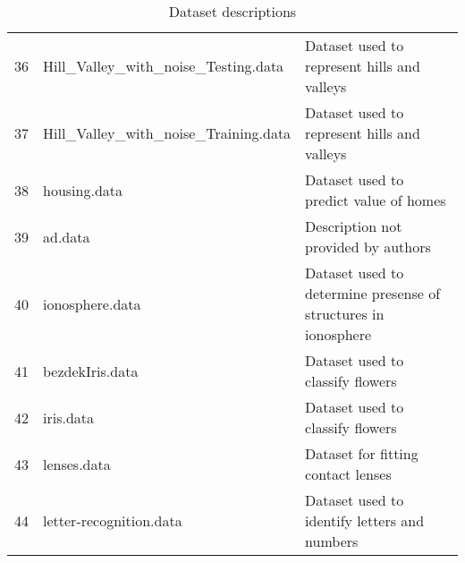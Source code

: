 \begin{table}
{\begin{tabular}{|l|l|l|}
36 &      Hill\_Valley\_with\_noise\_Testing.data & Dataset used to represent hills and valleys\\
37 &     Hill\_Valley\_with\_noise\_Training.data &  Dataset used to represent hills and valleys\\
38 &                             housing.data & Dataset used to predict value of homes\\
39 &                                  ad.data & Description not provided by authors\\
40 &                          ionosphere.data & Dataset used to determine presense of structures in ionosphere\\
41 &                          bezdekIris.data & Dataset used to classify flowers\\
42 &                                iris.data & Dataset used to classify flowers\\
43 &                              lenses.data & Dataset for fitting contact lenses\\
44 &                  letter-recognition.data & Dataset used to identify letters and numbers\\
\bottomrule
\end{tabular}}
\caption{Dataset descriptions}
\end{table}
